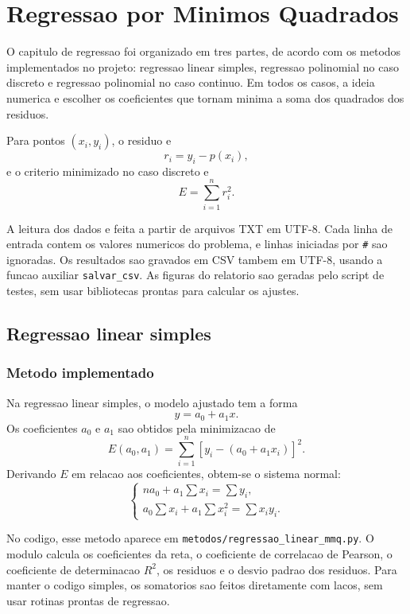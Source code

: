 \documentclass[../main.tex]{subfiles}
\begin{document}
\section{Regressao por Minimos Quadrados}

O capitulo de regressao foi organizado em tres partes, de acordo com os metodos
implementados no projeto: regressao linear simples, regressao polinomial no
caso discreto e regressao polinomial no caso continuo. Em todos os casos, a
ideia numerica e escolher os coeficientes que tornam minima a soma dos
quadrados dos residuos.

Para pontos \((x_i,y_i)\), o residuo e
\[
    r_i = y_i - p(x_i),
\]
e o criterio minimizado no caso discreto e
\[
    E = \sum_{i=1}^{n} r_i^2.
\]

A leitura dos dados e feita a partir de arquivos TXT em UTF-8. Cada linha de
entrada contem os valores numericos do problema, e linhas iniciadas por
\texttt{\#} sao ignoradas. Os resultados sao gravados em CSV tambem em UTF-8,
usando a funcao auxiliar \texttt{salvar\_csv}. As figuras do relatorio sao
geradas pelo script de testes, sem usar bibliotecas prontas para calcular os
ajustes.

\subsection{Regressao linear simples}

\subsubsection{Metodo implementado}

Na regressao linear simples, o modelo ajustado tem a forma
\[
    y = a_0 + a_1x.
\]
Os coeficientes \(a_0\) e \(a_1\) sao obtidos pela minimizacao de
\[
    E(a_0,a_1)=\sum_{i=1}^{n}\left[y_i-(a_0+a_1x_i)\right]^2.
\]
Derivando \(E\) em relacao aos coeficientes, obtem-se o sistema normal:
\[
\begin{cases}
    n a_0 + a_1\sum x_i = \sum y_i,\\
    a_0\sum x_i + a_1\sum x_i^2 = \sum x_i y_i.
\end{cases}
\]

No codigo, esse metodo aparece em \texttt{metodos/regressao\_linear\_mmq.py}.
O modulo calcula os coeficientes da reta, o coeficiente de correlacao de
Pearson, o coeficiente de determinacao \(R^2\), os residuos e o desvio padrao
dos residuos. Para manter o codigo simples, os somatorios sao feitos
diretamente com lacos, sem usar rotinas prontas de regressao.
\end{document}
